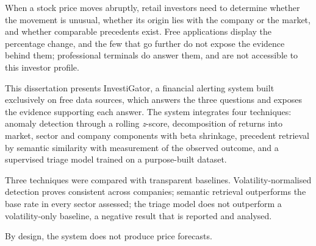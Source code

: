 \begin{abstractotherlanguage}
When a stock price moves abruptly, retail investors need to determine whether the movement is
unusual, whether its origin lies with the company or the market, and whether comparable precedents
exist. Free applications display the percentage change, and the few that go further do not
expose the evidence behind them;
professional terminals do answer them, and are not accessible to this investor profile.

This dissertation presents InvestiGator, a financial alerting system built exclusively on free data
sources, which answers the three questions and exposes the evidence supporting each answer. The
system integrates four techniques: anomaly detection through a rolling \emph{z}-score, decomposition
of returns into market, sector and company components with beta shrinkage, precedent retrieval by
semantic similarity with measurement of the observed outcome, and a supervised triage model trained
on a purpose-built dataset.

Three techniques were compared with transparent baselines. Volatility-normalised detection proves
consistent across companies; semantic retrieval outperforms the base rate in every sector assessed;
the triage model does not outperform a volatility-only baseline, a negative result that is reported
and analysed.

By design, the system does not produce price forecasts.
\end{abstractotherlanguage}
%
